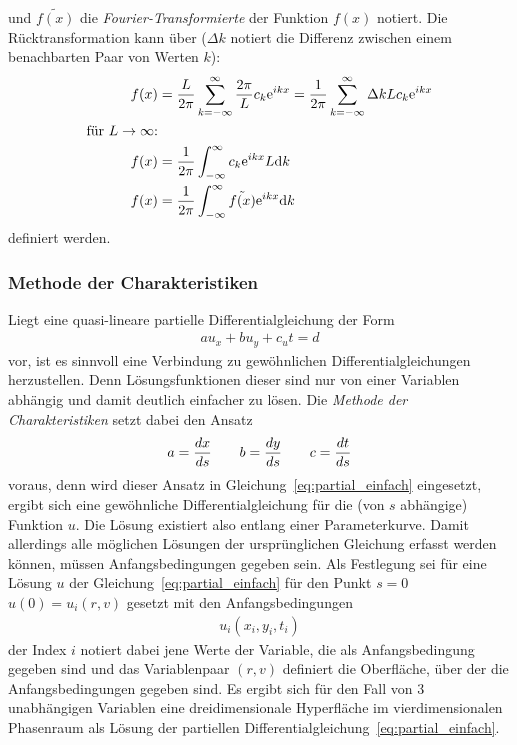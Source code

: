 und $\tilde{f(x)}$ die \emph{Fourier-Transformierte} der Funktion $f(x)$ notiert. Die Rücktransformation kann über ($\Delta k$ notiert die Differenz zwischen einem benachbarten Paar von Werten $k$):
\begin{align*}
    f(x) &= \frac{L}{2\pi}\sum_{k=-\infty}^{\infty}{\frac{2\pi}{L}c_k \text{e}^{ikx}} = \frac{1}{2\pi}\sum_{k=-\infty}^{\infty}{\Delta k Lc_k \text{e}^{ikx}} \\
    \text{für $L\to \infty$:} \\
    f(x) &= \frac{1}{2\pi}\int_{-\infty}^{\infty}{c_k \text{e}^{ikx} L \text{d} k} \\
    f(x) &= \frac{1}{2\pi}\int_{-\infty}^{\infty}{\tilde{f(x)}\text{e}^{ikx}\text{d} k}
\end{align*}
definiert werden.

\subsubsection{Methode der Charakteristiken}

Liegt eine quasi-lineare partielle Differentialgleichung der Form
\begin{align}
\label{eq:partial_einfach}
    au_x + bu_y+c_ut = d
\end{align}
vor, ist es sinnvoll eine Verbindung zu gewöhnlichen Differentialgleichungen herzustellen. Denn Lösungsfunktionen dieser sind nur von einer Variablen abhängig und damit deutlich einfacher zu lösen. Die \emph{Methode der Charakteristiken} setzt dabei den Ansatz
\begin{align}
    a=\frac{d x}{d s} \qquad b=\frac{d y}{d s} \qquad c=\frac{d t}{d s}
\end{align}
voraus, denn wird dieser Ansatz in Gleichung~\eqref{eq:partial_einfach} eingesetzt, ergibt sich eine gewöhnliche Differentialgleichung für die (von $s$ abhängige) Funktion $u$. Die Lösung existiert also entlang einer Parameterkurve. Damit allerdings alle möglichen Lösungen der ursprünglichen Gleichung erfasst werden können, müssen Anfangsbedingungen gegeben sein. Als Festlegung sei für eine Lösung $u$ der Gleichung~\eqref{eq:partial_einfach} für den Punkt $s=0$ $u(0)=u_i (r,v)$ gesetzt mit den Anfangsbedingungen
\begin{align*}
    u_i(x_i,y_i,t_i)
\end{align*}
der Index $i$ notiert dabei jene Werte der Variable, die als Anfangsbedingung gegeben sind und das Variablenpaar $(r,v)$ definiert die Oberfläche, über der die Anfangsbedingungen gegeben sind. Es ergibt sich für den Fall von 3 unabhängigen Variablen eine dreidimensionale Hyperfläche im vierdimensionalen Phasenraum als Lösung der partiellen Differentialgleichung~\eqref{eq:partial_einfach}.